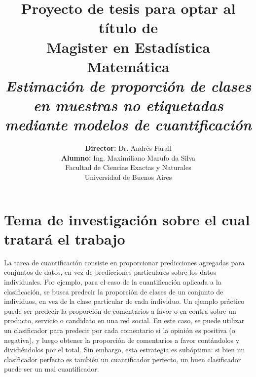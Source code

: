 \documentclass[a4paper, twoside, 11pt, spanish]{article}
\begin{document}
\begin{titlepage}

\title{ \textbf{Proyecto de tesis para optar al título de \\ Magister en
    Estadística Matemática}\\[2.5ex]
    \textit{Estimación de proporción de clases en muestras no etiquetadas \\ 
    mediante modelos de cuantificación} }

\author{ \textbf{Director:} Dr. Andrés Farall \\[2.5ex]
    \textbf{Alumno:} Ing. Maximiliano Marufo da Silva \\[2.5ex]
    \normalsize{Facultad de Ciencias Exactas y Naturales} \\
    \normalsize{Universidad de Buenos Aires} \\
}
\date{}

\end{titlepage}

\maketitle

\section*{Tema de investigación sobre el cual tratará el trabajo}

La tarea de cuantificación consiste en proporcionar predicciones agregadas para
conjuntos de datos, en vez de predicciones particulares sobre los datos
individuales. Por ejemplo, para el caso de la cuantificación aplicada a la
clasificación, se busca predecir la proporción de clases de un conjunto de
individuos, en vez de la clase particular de cada individuo. Un ejemplo práctico
puede ser predecir la proporción de comentarios a favor o en contra sobre un
producto, servicio o candidato en una red social. En este caso, se puede
utilizar un clasificador para predecir por cada comentario si la opinión es
positiva (o negativa), y luego obtener la proporción de comentarios a favor
contándolos y dividiéndolos por el total. Sin embargo, esta estrategia es
subóptima: si bien un clasificador perfecto es también un cuantificador
perfecto, un buen clasificador puede ser un mal cuantificador.
\end{document}
